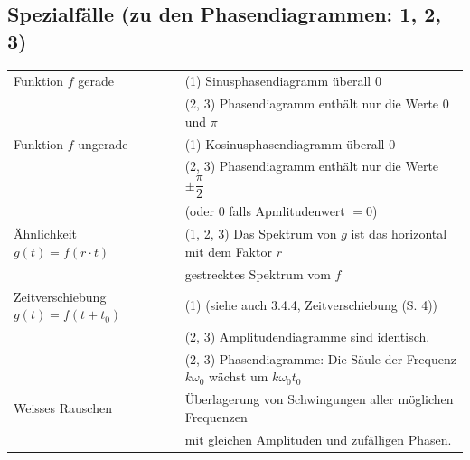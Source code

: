 	\subsection{Spezialfälle (zu den Phasendiagrammen: 1, 2, 3)}
		\begin{tabular}{ll}
			Funktion $f$ gerade & (1) Sinusphasendiagramm überall $0$\\[3pt]
			 & (2, 3) Phasendiagramm enthält nur die Werte $0$ und $\pi$\\[3pt]
	 		Funktion $f$ ungerade & (1) Kosinusphasendiagramm überall $0$\\[3pt]
	 		 & (2, 3) Phasendiagramm enthält nur die Werte $\pm \dfrac{\pi}{2}$\\[3pt] 
	 		 & (oder $0$ falls Apmlitudenwert $= 0$)\\[3pt]
	 		Ähnlichkeit $g(t) = f(r \cdot t)$ & (1, 2, 3) Das Spektrum von $g$ ist das horizontal mit dem Faktor $r$\\[3pt]
	 		 & gestrecktes Spektrum vom $f$\\[3pt]
	 		Zeitverschiebung $g(t) = f(t + t_0)$ & (1) (siehe auch 3.4.4, Zeitverschiebung (S. 4))\\[3pt]
	 		 & (2, 3) Amplitudendiagramme sind identisch.\\[3pt]
	 		 & (2, 3) Phasendiagramme: Die Säule der Frequenz $k \omega_0$ wächst um $k \omega_0 t_0$\\[3pt]
	 		Weisses Rauschen & Überlagerung von Schwingungen aller möglichen Frequenzen\\[3pt]
	 		 & mit gleichen Amplituden und zufälligen Phasen.\\[3pt]
		\end{tabular}

